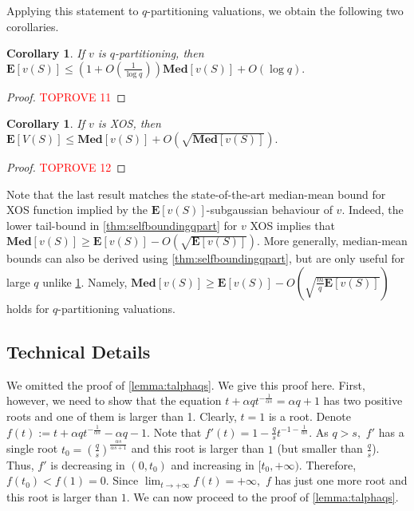 \documentclass[11pt]{article}%
\newtheorem{corollary}[theorem]{Corollary}
\numberwithin{theorem}{subsection}
\newcommand{\median}{\mathbf{Med}}
\newcommand{\expect}{\mathbf{E}}
\begin{document}
\noindent
Applying this statement to $q$-partitioning valuations, we obtain the following two corollaries.

\begin{corollary}
\label{cor:medianmeanqpart}
If $v$ is $q$-partitioning, then 
$\expect[v(S)]\le (1 + O(\frac{1}{\log q}))\median[v(S)] + O(\log q).$
\end{corollary}
\begin{proof}\textcolor{red}{TOPROVE 11}\end{proof}

\begin{corollary}
If $v$ is XOS, 
then $\expect[V(S)]\le \median[v(S)] + O(\sqrt{\median[v(S)]}).$
\end{corollary}
\begin{proof}\textcolor{red}{TOPROVE 12}\end{proof}

\noindent
Note that the last result matches the state-of-the-art median-mean bound for XOS function implied by the $\expect[v(S)]$-subgaussian behaviour of $v.$ Indeed, the lower tail-bound in \cref{thm:selfboundingqpart} for $v$ XOS
implies that $\median[v(S)]\ge \expect[v(S)] - 
O(\sqrt{\expect[v(S)]}).
$ More generally, median-mean bounds can also be derived using \cref{thm:selfboundingqpart}, but are only useful for large $q$ unlike \cref{cor:medianmeanqpart}. Namely,
 $\median[v(S)]\ge \expect[v(S)] - 
O(\sqrt{\frac{m}{q}\expect[v(S)]})
$ holds for $q$-partitioning valuations. 

\subsection{Technical Details}
\label{section:appendixtalphaqs}
We omitted the proof of \cref{lemma:talphaqs}. We give this proof here. First, however, we need to show that the equation $t + \alpha q t^{-\frac{1}{\alpha s}} = \alpha q + 1$ has two positive roots and one of them is larger than 1. Clearly, $t = 1$ is a root. Denote $f(t):= t + \alpha q t^{-\frac{1}{\alpha s}}-\alpha q - 1.$ Note that 
$f'(t) = 1 - \frac{q}{s}t^{-1-\frac{1}{\alpha s}}.$ As $q>s,$ $f'$ has a single root $t_0 = \left(\frac{q}{s}\right)^\frac{\alpha s}{\alpha s + 1}$ and this root is larger than $1$ (but smaller than $\frac{q}{s}$). Thus, $f'$ is decreasing in $(0,t_0) $ and increasing in $[t_0, +\infty).$ Therefore, $f(t_0)<f(1) = 0.$ Since $\lim_{t\longrightarrow+\infty} f(t) =+\infty,$ $f$ has just one more root and this root is larger than $1.$ We can now proceed to the proof of \cref{lemma:talphaqs}.
\end{document}
